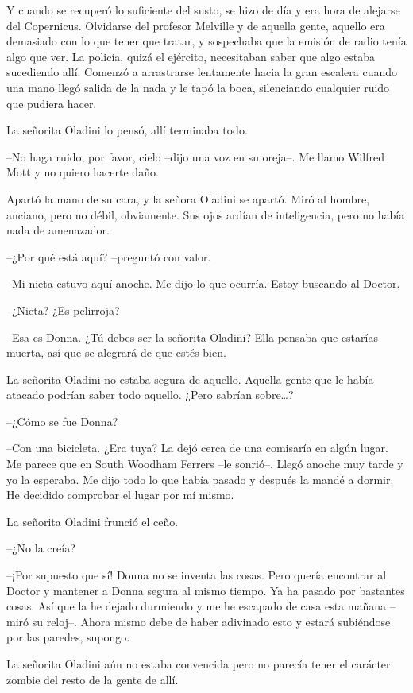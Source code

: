 Y cuando se recuperó lo suficiente del susto, se hizo de día y era hora
de alejarse del Copernicus. Olvidarse del profesor Melville y de aquella
gente, aquello era demasiado con lo que tener que tratar, y sospechaba
que la emisión de radio tenía algo que ver. La policía, quizá el
ejército, necesitaban saber que algo estaba sucediendo allí. Comenzó a
arrastrarse lentamente hacia la gran escalera cuando una mano llegó
salida de la nada y le tapó la boca, silenciando cualquier ruido que
pudiera hacer.

La señorita Oladini lo pensó, allí terminaba todo.

--No haga ruido, por favor, cielo --dijo una voz en su oreja--. Me llamo
Wilfred Mott y no quiero hacerte daño.

Apartó la mano de su cara, y la señora Oladini se apartó. Miró al
hombre, anciano, pero no débil, obviamente. Sus ojos ardían de
inteligencia, pero no había nada de amenazador.

--¿Por qué está aquí? --preguntó con valor.

--Mi nieta estuvo aquí anoche. Me dijo lo que ocurría. Estoy buscando al
Doctor.

--¿Nieta? ¿Es pelirroja?

--Esa es Donna. ¿Tú debes ser la señorita Oladini? Ella pensaba que
estarías muerta, así que se alegrará de que estés bien.

La señorita Oladini no estaba segura de aquello. Aquella gente que le
había atacado podrían saber todo aquello. ¿Pero sabrían sobre\ldots{}?

--¿Cómo se fue Donna?

--Con una bicicleta. ¿Era tuya? La dejó cerca de una comisaría en algún
lugar. Me parece que en South Woodham Ferrers --le sonrió--. Llegó
anoche muy tarde y yo la esperaba. Me dijo todo lo que había pasado y
después la mandé a dormir. He decidido comprobar el lugar por mí mismo.

La señorita Oladini frunció el ceño.

--¿No la creía?

--¡Por supuesto que sí! Donna no se inventa las cosas. Pero quería
encontrar al Doctor y mantener a Donna segura al mismo tiempo. Ya ha
pasado por bastantes cosas. Así que la he dejado durmiendo y me he
escapado de casa esta mañana --miró su reloj--. Ahora mismo debe de
haber adivinado esto y estará subiéndose por las paredes, supongo.

La señorita Oladini aún no estaba convencida pero no parecía tener el
carácter zombie del resto de la gente de allí.

